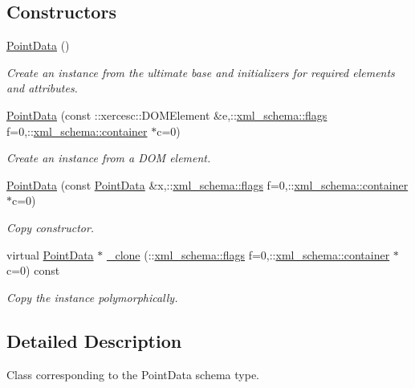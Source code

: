 \subsection*{Constructors}
\begin{DoxyCompactItemize}
\item 
\hyperlink{classPointData_add74ef42ae2c48850449cd59e216111f}{Point\+Data} ()
\begin{DoxyCompactList}\small\item\em Create an instance from the ultimate base and initializers for required elements and attributes. \end{DoxyCompactList}\item 
\hyperlink{classPointData_ae0d2a9251b2690a28a04a96105874e45}{Point\+Data} (const \+::xercesc\+::\+D\+O\+M\+Element \&e,\+::\hyperlink{namespacexml__schema_a8d981c127a1f5106d04ad5853e707361}{xml\+\_\+schema\+::flags} f=0,\+::\hyperlink{namespacexml__schema_a395f5179c5fc4643909d66e9ff28d8ca}{xml\+\_\+schema\+::container} $\ast$c=0)
\begin{DoxyCompactList}\small\item\em Create an instance from a D\+O\+M element. \end{DoxyCompactList}\item 
\hyperlink{classPointData_a552557267dd3178a8e76be436b0709bc}{Point\+Data} (const \hyperlink{classPointData}{Point\+Data} \&x,\+::\hyperlink{namespacexml__schema_a8d981c127a1f5106d04ad5853e707361}{xml\+\_\+schema\+::flags} f=0,\+::\hyperlink{namespacexml__schema_a395f5179c5fc4643909d66e9ff28d8ca}{xml\+\_\+schema\+::container} $\ast$c=0)
\begin{DoxyCompactList}\small\item\em Copy constructor. \end{DoxyCompactList}\item 
virtual \hyperlink{classPointData}{Point\+Data} $\ast$ \hyperlink{classPointData_aeb33ffedc35f8abc9ffd0d2f053c68ac}{\+\_\+clone} (\+::\hyperlink{namespacexml__schema_a8d981c127a1f5106d04ad5853e707361}{xml\+\_\+schema\+::flags} f=0,\+::\hyperlink{namespacexml__schema_a395f5179c5fc4643909d66e9ff28d8ca}{xml\+\_\+schema\+::container} $\ast$c=0) const 
\begin{DoxyCompactList}\small\item\em Copy the instance polymorphically. \end{DoxyCompactList}\end{DoxyCompactItemize}


\subsection{Detailed Description}
Class corresponding to the Point\+Data schema type. 

